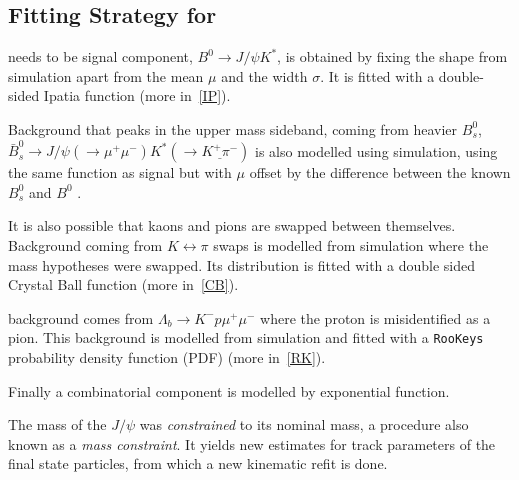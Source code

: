 \subsection{Fitting Strategy for }
\DIFdelbegin {}\DIFdelend \DIFaddbegin {}\DIFaddend needs to be \DIFdelbegin {}\DIFdelend \DIFaddbegin {}\DIFaddend signal component, $B^{0} \rightarrow J/\psi K^{*}$, is obtained by fixing the shape from simulation apart from the mean $\mu$ and the width $\sigma$. It is fitted with a double-sided Ipatia function \cite{Santos:2013gra} (more in~\autoref{IP}). \DIFaddbegin {}\DIFaddend 

Background that peaks in the upper mass sideband, coming from heavier $B^{0}_{s}$, $\bar{B}^{0}_{s} \rightarrow J/\psi (\rightarrow \mu^{+} \mu^{-}) K^*(\rightarrow \underline{K^{+} \pi^{-}})$ is also modelled using simulation, using the same function as signal but with $\mu$ offset by the difference between the known $B^{0}_{s}$ and $B^{0}$ \DIFaddbegin {}\DIFaddend .

It is also possible that kaons and pions are swapped between themselves. Background coming from $K \leftrightarrow \pi$ swaps is modelled from simulation where the mass hypotheses were swapped. Its distribution is fitted with a double sided Crystal Ball function \cite{Skwarnicki:1986xj} (more in~\autoref{CB}).

\DIFdelbegin {}\DIFdelend \DIFaddbegin {}\DIFaddend background comes from \DIFdelbegin {}\DIFdelend \DIFaddbegin {}\DIFaddend $\Lambda_{b} \rightarrow K^{-} p \mu^{+} \mu^{-}$ where the proton is misidentified as a pion. This background is modelled from simulation and fitted with a \texttt{RooKeys} probability density function (PDF) (more in~\autoref{RK}).

Finally a combinatorial component is modelled by \DIFdelbegin {}\DIFdelend \DIFaddbegin {}\DIFaddend exponential function.


The mass of the $J/\psi$ was \textit{constrained} to its nominal mass, a procedure also known as a \textit{mass constraint}. It yields new estimates for track parameters of the final state particles, from which a new kinematic refit is done.

